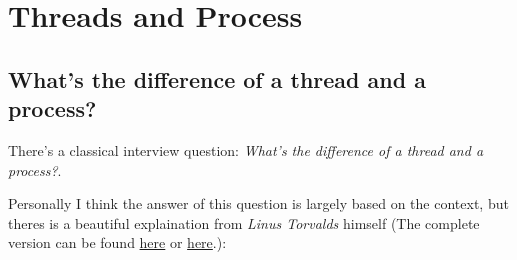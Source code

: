 \section{Threads and Process}

\subsection{What's the difference of a thread and a process?}
There's a classical interview question: \textit{What's the difference of a thread and a process?}.

Personally I think the answer of this question is largely based on the context, but theres is a beautiful explaination from \textit{Linus Torvalds} himself
(The complete version can be found \href{https://www.evanjones.ca/software/threading-linus-msg.html}{here} or \href{https://lkml.iu.edu/hypermail/linux/kernel/9608/0191.html}{here}.):

\bigbreak

